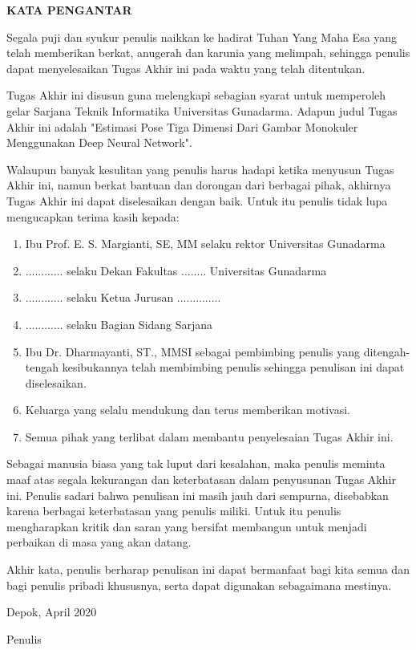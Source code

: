 \newpage %
\begin{center}
\begin{large}\textbf{KATA PENGANTAR}\\\end{large}
\end{center}
\vspace{5mm}


Segala puji dan syukur penulis naikkan ke hadirat Tuhan Yang Maha Esa yang telah memberikan berkat, 
anugerah dan karunia yang melimpah, sehingga penulis dapat menyelesaikan Tugas Akhir ini pada waktu 
yang telah ditentukan.

Tugas Akhir ini disusun guna melengkapi sebagian syarat untuk memperoleh gelar Sarjana Teknik 
Informatika Universitas Gunadarma. Adapun judul Tugas Akhir ini adalah "Estimasi Pose Tiga Dimensi
Dari Gambar Monokuler Menggunakan Deep Neural Network".

Walaupun banyak kesulitan yang penulis harus hadapi ketika menyusun Tugas Akhir ini, namun berkat 
bantuan dan dorongan dari berbagai pihak, akhirnya Tugas Akhir ini dapat diselesaikan dengan baik. 
Untuk itu penulis tidak lupa mengucapkan terima kasih kepada:

\begin{enumerate}
  \item Ibu Prof. E. S. Margianti, SE, MM selaku rektor Universitas Gunadarma
  \item ............ selaku Dekan Fakultas ........ Universitas Gunadarma
  \item ............ selaku Ketua Jurusan ..............
  \item ............ selaku Bagian Sidang Sarjana
  \item Ibu Dr. Dharmayanti, ST., MMSI sebagai pembimbing penulis yang ditengah-tengah kesibukannya 
  telah membimbing penulis sehingga penulisan ini dapat diselesaikan.
  \item Keluarga yang selalu mendukung dan terus memberikan motivasi.
  \item Semua pihak yang terlibat dalam membantu penyelesaian Tugas Akhir ini.

\end{enumerate}

Sebagai manusia biasa yang tak luput dari kesalahan, maka penulis meminta maaf atas segala 
kekurangan dan keterbatasan dalam penyusunan Tugas Akhir ini. Penulis sadari bahwa penulisan ini 
masih jauh dari sempurna, disebabkan karena berbagai keterbatasan yang penulis miliki. Untuk itu 
penulis mengharapkan kritik dan saran yang bersifat membangun untuk menjadi perbaikan di masa yang 
akan datang.

Akhir kata, penulis berharap penulisan ini dapat bermanfaat bagi kita semua dan bagi penulis 
pribadi khususnya, serta dapat digunakan sebagaimana mestinya.


\vspace{0.5 cm}
\begin{flushright}
Depok, April 2020

\vspace{2 cm}
Penulis
\end{flushright}